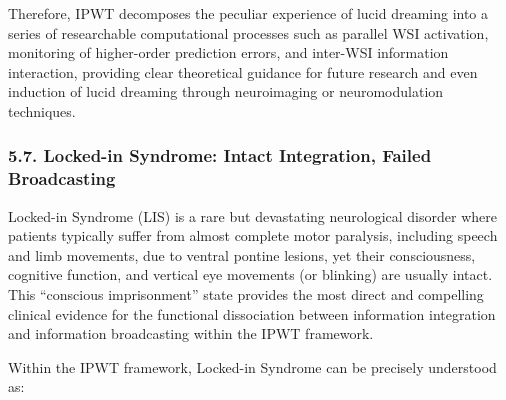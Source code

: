 \documentclass[
  a4paper]{article}
\begin{document}
Therefore, IPWT decomposes the peculiar experience of lucid dreaming
into a series of researchable computational processes such as parallel
WSI activation, monitoring of higher-order prediction errors, and
inter-WSI information interaction, providing clear theoretical guidance
for future research and even induction of lucid dreaming through
neuroimaging or neuromodulation techniques.

\subsubsection{5.7. Locked-in Syndrome: Intact Integration, Failed
Broadcasting}\label{locked-in-syndrome-intact-integration-failed-broadcasting}

Locked-in Syndrome (LIS) is a rare but devastating neurological disorder
where patients typically suffer from almost complete motor paralysis,
including speech and limb movements, due to ventral pontine lesions, yet
their consciousness, cognitive function, and vertical eye movements (or
blinking) are usually intact. This ``conscious imprisonment'' state
provides the most direct and compelling clinical evidence for the
functional dissociation between information integration and information
broadcasting within the IPWT framework.

Within the IPWT framework, Locked-in Syndrome can be precisely
understood as:
\end{document}
